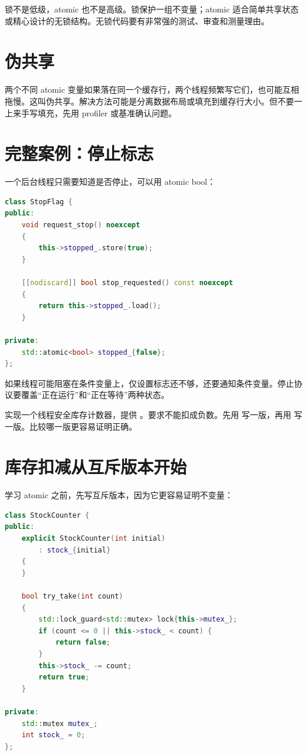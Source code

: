 锁不是低级，atomic 也不是高级。锁保护一组不变量；atomic 适合简单共享状态或精心设计的无锁结构。无锁代码要有非常强的测试、审查和测量理由。

\section{伪共享}

两个不同 atomic 变量如果落在同一个缓存行，两个线程频繁写它们，也可能互相拖慢。这叫伪共享。解决方法可能是分离数据布局或填充到缓存行大小。但不要一上来手写填充，先用 profiler 或基准确认问题。

\section{完整案例：停止标志}

一个后台线程只需要知道是否停止，可以用 atomic bool：

\begin{lstlisting}[language=C++,caption={停止标志}]
class StopFlag {
public:
    void request_stop() noexcept
    {
        this->stopped_.store(true);
    }

    [[nodiscard]] bool stop_requested() const noexcept
    {
        return this->stopped_.load();
    }

private:
    std::atomic<bool> stopped_{false};
};
\end{lstlisting}

如果线程可能阻塞在条件变量上，仅设置标志还不够，还要通知条件变量。停止协议要覆盖“正在运行”和“正在等待”两种状态。

\begin{exercisebox}
实现一个线程安全库存计数器，提供 。要求不能扣成负数。先用  写一版，再用  写一版。比较哪一版更容易证明正确。
\end{exercisebox}

\section{库存扣减从互斥版本开始}

学习 atomic 之前，先写互斥版本，因为它更容易证明不变量：

\begin{lstlisting}[language=C++,caption={互斥量版本库存扣减}]
class StockCounter {
public:
    explicit StockCounter(int initial)
        : stock_{initial}
    {
    }

    bool try_take(int count)
    {
        std::lock_guard<std::mutex> lock{this->mutex_};
        if (count <= 0 || this->stock_ < count) {
            return false;
        }
        this->stock_ -= count;
        return true;
    }

private:
    std::mutex mutex_;
    int stock_ = 0;
};
\end{lstlisting}

